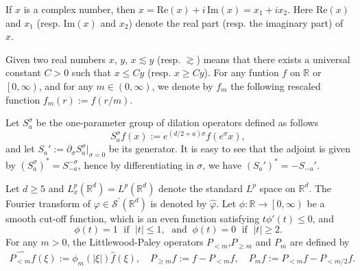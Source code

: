 \documentclass[reqno, 11pt]{amsart}
\numberwithin{equation}{section}
\newcommand{\R}{\mathbb{R}}
\theoremstyle{plain}
\theoremstyle{definition}
\numberwithin{equation}{section}
\numberwithin{theorem}{section}
\numberwithin{equation}{section}
\renewcommand{\Im}{\mathrm{Im}}
\numberwithin{equation}{section}
\numberwithin{theorem}{section}
\begin{document}
	If $x$ is a complex number, then $ x=\mathrm{Re}(x)+i\, \mathrm{Im}(x)=x_1+ix_2$. Here $\mathrm{Re}(x)$ and $x_1$ (resp. $\Im(x)$ and $x_2$) denote the real part (resp. the imaginary part) of $x$. 
	
	Given two real numbers $x$, $y$, $x\lesssim y$ (resp. $\gtrsim$) means that there exists a universal constant $C>0$ such that $x\leq Cy$ (resp. $x\geq Cy$). For any funtion $f$ on $\mathbb{R}$ or $\left[0, \infty \right)$, and for any $m \in \left(0, \infty \right)$, we denote by $f_{m}$ the following rescaled function
	$
	f_{m}(r):=f\left( r/m \right).
	$
	
	Let $S_{a}^{\sigma}$ be the one-parameter group of dilation operators defined as follows
	\begin{equation*}
	S_{a}^{\sigma}f(x):=e^{(d/2+a)\sigma}f\left( e^{\sigma}x\right),
	\end{equation*}
	and let $S_{a}':=\partial_{\sigma}S_{a}^{\sigma}|_{\sigma=0}$ be its generator. It is easy to see that the adjoint is given by $\left( S_{a}^{\sigma}\right)^{*}=S_{-a}^{-\sigma}$, hence by differentiating in $\sigma$, we have
	$
	\left( S_{a}'\right)^*=-S_{-a}'.
	$
	
	Let $d\geq 5$ and  $L_{x}^{p}(\R^d)=L^p(\R^d)$ denote the standard $L^p$ space on $\mathbb{R}^d$. The Fourier transform of $\varphi \in \mathcal{S}^{'}(\mathbb{R}^d) $ is denoted by $\widehat{\varphi}$. Let $\phi:\mathbb{R} \rightarrow \left[0, \infty\right)$ be a smooth cut-off function, which is an even function satisfying  $t\phi'(t)\leq0$,  and 
	\begin{equation}\label{funct:cutf funct}
	\phi(t)=1 \;\text{ if }\;
	|t|\leq 1 , \; \text{  and}\; \; 
	\phi(t)=0
	\; \text{ if } \;  |t|\geq 2   . 
	\end{equation}
	For any $m>0$, the Littlewood-Paley operators $P_{<m}$,\enspace$P_{\geq m}$ and $P_{m}$ are defined by
	\begin{equation*}
	\begin{aligned}
	\widehat{P_{<m}f}(\xi):=\phi_m(|\xi|)\widehat{f}(\xi),\quad P_{\geq m}f :=f-P_{<m}f,\quad P_{m}f:=P_{<m} f -P_{<m/2}f.
	\end{aligned}
	\end{equation*}
	
\end{document}
